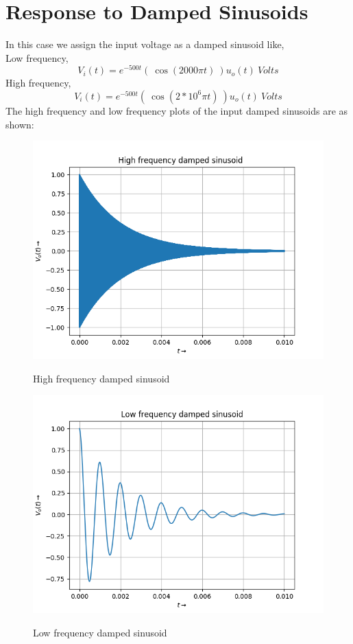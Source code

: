 \documentclass[11pt, a4paper]{article}
\begin{document}
\section*{Response to Damped Sinusoids}
In this case we assign the input voltage as a damped sinusoid like,\\
Low frequency,
\begin{equation*}
    V_{i}(t) = e^{-500t}( \ \cos(2000\pi t) \ )u_{o}(t) \ Volts
\end{equation*}
High frequency,
\begin{equation*}
    V_{i}(t) = e^{-500t}( \ \cos(2*10^{6}\pi t) \ )u_{o}(t) \ Volts
\end{equation*}
The high frequency and low frequency plots of the input damped sinusoids are as shown:\newpage
\begin{figure}[!tbh]
   	\centering
   	\includegraphics[scale=0.6]{Figure_4.png}
   	\label{fig:32}
   	\caption{High frequency damped sinusoid}
   \end{figure}
\begin{figure}[!tbh]
   	\centering
   	\includegraphics[scale=0.6]{Figure_5.png}
   	\label{fig:32}
   	\caption{Low frequency damped sinusoid}
   \end{figure}
\end{document}
